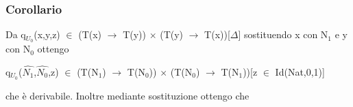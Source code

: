 \subsubsection{Corollario}
Da q$_{U_0}$(x,y,z) $\in$ (T(x) $\rightarrow$ T(y)) $\times$ (T(y) $\rightarrow$ T(x))[$\Delta$] sostituendo x con N$_1$ e y con N$_0$ ottengo \begin{center} q$_{U_0}$($\hat{N_1}$,$\hat{N_0}$,z) $\in$ (T(N$_1$) $\rightarrow$ T(N$_0$)) $\times$ (T(N$_0$) $\rightarrow$ T(N$_1$))[z $\in$ Id(Nat,0,1)] \end{center} che \`e derivabile. Inoltre mediante sostituzione ottengo che
\scriptsize
\begin{adjustwidth}{-6em}{}
\begin{prooftree}
\end{prooftree}
\end{adjustwidth}

